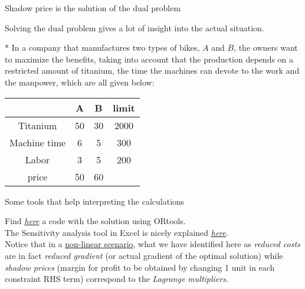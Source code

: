 \documentclass[c]{beamer}
\begin{document}

\begin{frame}{Shadow price is the solution of the dual problem}

  Solving the dual problem gives a lot of insight into the actual situation.

  \begin{Exercise}*
  In a company that manufactures two types of bikes, $A$ and $B$, the owners want to maximize the benefits, taking into account that the production depends on a restricted amount of titanium, the time the machines can devote to the work and the manpower, which are all given below:
  \begin{center}
  \begin{tabular}{c|c|c|c}
   & A & B & limit\\
   \hline
   Titanium & 50 & 30 & 2000\\
    Machine time & 6 & 5 & 300\\
    Labor & 3 & 5 &200\\
   \hline
   price & 50 & 60 & \\
  \end{tabular}
  \end{center}



  \end{Exercise}

\end{frame}

\begin{frame}{Some tools that help interpreting the calculations}

  Find \href{https://github.com/Biocomputing-Teaching/ORcourse/blob/main/code/linear_programming.ipynb}{\em here} a code with the solution using ORtools.
  \\[10pt]
  The Sensitivity analysis tool in Excel is nicely explained \href{https://www.youtube.com/watch?v=zKqU5NGE-t0&list=PLjiMsqjDUvBiArYMqCGZSDJNgEMPALdQu&index=1}{\em here}.
\\[10pt]
  Notice that in a \href{https://youtu.be/v2ZuKwAaXOI}{non-linear scenario}, what we have identified here as {\em reduced costs} are in fact {\em reduced gradient} (or actual gradient of the optimal solution) while {\em shadow prices} (margin for profit to be obtained by changing 1 unit in each constraint RHS term) correspond to the {\em Lagrange multipliers}.

\end{frame}



\end{document}

